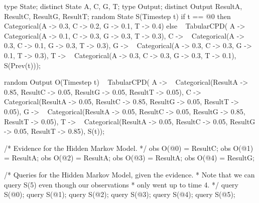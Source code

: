 \documentclass[12pt]{article}
\begin{document}
\begin{blogcode}
type State;
distinct State A, C, G, T;
type Output;
distinct Output ResultA, ResultC, ResultG, ResultT;
random State S(Timestep t)
  if t == @0 then 
    ~ Categorical({A -> 0.3, C -> 0.2, G -> 0.1, T -> 0.4})
  else ~ TabularCPD(
    {A -> ~ Categorical({A -> 0.1, C -> 0.3, G -> 0.3, T -> 0.3}),
     C -> ~ Categorical({A -> 0.3, C -> 0.1, G -> 0.3, T -> 0.3}),
     G -> ~ Categorical({A -> 0.3, C -> 0.3, G -> 0.1, T -> 0.3}),
     T -> ~ Categorical({A -> 0.3, C -> 0.3, G -> 0.3, T -> 0.1})},
    S(Prev(t)));

random Output O(Timestep t)
  ~ TabularCPD(
    {A -> ~ Categorical({ResultA -> 0.85, ResultC -> 0.05,
                         ResultG -> 0.05, ResultT -> 0.05}),
    C -> ~ Categorical({ResultA -> 0.05, ResultC -> 0.85, 
                        ResultG -> 0.05, ResultT -> 0.05}),
    G -> ~ Categorical({ResultA -> 0.05, ResultC -> 0.05, 
                        ResultG -> 0.85, ResultT -> 0.05}),
    T -> ~ Categorical({ResultA -> 0.05, ResultC -> 0.05, 
                        ResultG -> 0.05, ResultT -> 0.85})},
    S(t));

/* Evidence for the Hidden Markov Model.
 */
obs O(@0) = ResultC;
obs O(@1) = ResultA;
obs O(@2) = ResultA;
obs O(@3) = ResultA;
obs O(@4) = ResultG;

/* Queries for the Hidden Markov Model, given the evidence.  
 * Note that we can query S(5) even though our observations 
 * only went up to time 4.
 */
query S(@0);
query S(@1);
query S(@2);
query S(@3);
query S(@4);
query S(@5);
\end{blogcode}

\appendix
\end{document}
